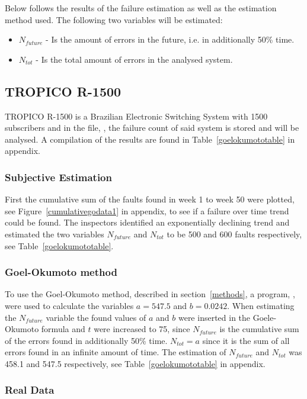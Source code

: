 Below follows the results of the failure estimation as well as the estimation method used. 
The following two variables will be estimated:
\begin{itemize}
 \item $N_{future}$ - Is the amount of errors in the future, i.e. in additionally 50\% time.
 \item $N_{tot}$ - Is the total amount of errors in the analysed system.
\end{itemize}

\subsection{TROPICO R-1500}
TROPICO R-1500 is a Brazilian Electronic Switching System with 1500 subscribers and in the file, , the failure count of said system is stored and will be analysed. A compilation of the results are found in Table~\ref{goelokumototable} in appendix.
\subsubsection*{Subjective Estimation} 
First the cumulative sum of the faults found in week 1 to week 50 were plotted, see Figure~\ref{cumulativegodata1} in appendix, to see if a failure over time trend could be found.
The inspectors identified an exponentially declining trend and estimated the two variables $N_{future}$ and $N_{tot}$ to be 500 and 600 faults respectively, see Table~\ref{goelokumototable}. 
\subsubsection*{Goel-Okumoto method}
To use the Goel-Okumoto method, described in section~\ref{methods}, a program, , were used to calculate the variables $a=547.5$ and $b=0.0242$.
When estimating the $N_{future}$ variable the found values of $a$ and $b$ were inserted in the Goele-Okumoto formula and $t$ were increased to 75, since $N_{future}$ is the cumulative sum of the errors found in additionally 50\% time. 
$N_{tot} = a$ since it is the sum of all errors found in an infinite amount of time.
The estimation of $N_{future}$ and $N_{tot}$ was 458.1 and 547.5 respectively, see Table~\ref{goelokumototable} in appendix.
\subsubsection*{Real Data}

